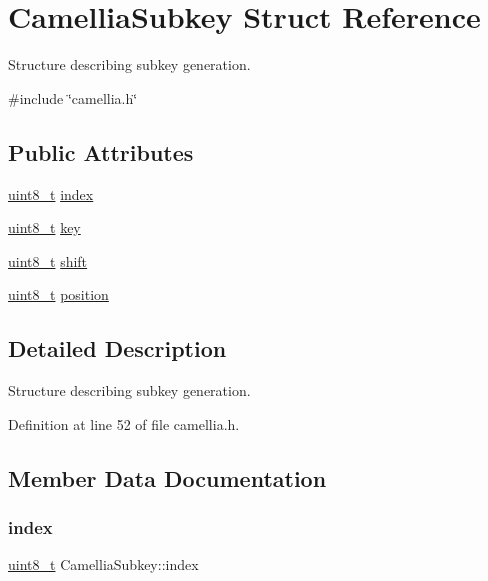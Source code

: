 \hypertarget{structCamelliaSubkey}{}\section{Camellia\+Subkey Struct Reference}
\label{structCamelliaSubkey}


Structure describing subkey generation.  




{\ttfamily \#include \char`\"{}camellia.\+h\char`\"{}}

\subsection*{Public Attributes}
\begin{DoxyCompactItemize}
\item 
\hyperlink{stdint_8h_aba7bc1797add20fe3efdf37ced1182c5}{uint8\+\_\+t} \hyperlink{structCamelliaSubkey_ae3fdfef5ccf7b49fc347ade24fe3e3ca}{index}
\item 
\hyperlink{stdint_8h_aba7bc1797add20fe3efdf37ced1182c5}{uint8\+\_\+t} \hyperlink{structCamelliaSubkey_a9d4ee77359241e8eada1a3fff35551ce}{key}
\item 
\hyperlink{stdint_8h_aba7bc1797add20fe3efdf37ced1182c5}{uint8\+\_\+t} \hyperlink{structCamelliaSubkey_af62ef58a7800c83d492f05b8f1c04af0}{shift}
\item 
\hyperlink{stdint_8h_aba7bc1797add20fe3efdf37ced1182c5}{uint8\+\_\+t} \hyperlink{structCamelliaSubkey_a851bbb32cfc2269202af66ef72aa897d}{position}
\end{DoxyCompactItemize}


\subsection{Detailed Description}
Structure describing subkey generation. 

Definition at line 52 of file camellia.\+h.



\subsection{Member Data Documentation}
\mbox{\label{structCamelliaSubkey_ae3fdfef5ccf7b49fc347ade24fe3e3ca}} 
\subsubsection{\texorpdfstring{index}{index}}
{\footnotesize\ttfamily \hyperlink{stdint_8h_aba7bc1797add20fe3efdf37ced1182c5}{uint8\+\_\+t} Camellia\+Subkey\+::index}



